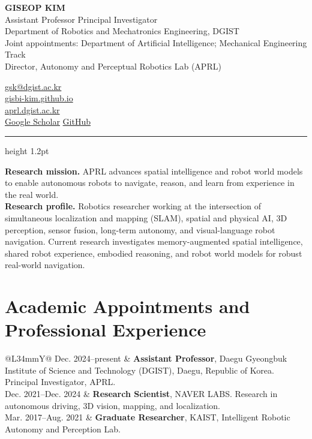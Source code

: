 \documentclass[10pt,a4paper]{article}
\newcommand{\daterow}[2]{#1 & #2 \\[2.2pt]}
\begin{document}
\begin{minipage}[t]{0.63\textwidth}
  {\sffamily\bfseries\fontsize{28}{31}\selectfont GISEOP KIM}\\[4pt]
  {\sffamily\large Assistant Professor \textbar{} Principal Investigator}\\[3pt]
  Department of Robotics and Mechatronics Engineering, DGIST\\
  Joint appointments: Department of Artificial Intelligence; Mechanical Engineering Track\\
  Director, Autonomy and Perceptual Robotics Lab (APRL)
\end{minipage}
\hfill
\begin{minipage}[t]{0.33\textwidth}
  \raggedleft\small
  \href{mailto:gsk@dgist.ac.kr}{gsk@dgist.ac.kr}\\
  \href{https://gisbi-kim.github.io/}{gisbi-kim.github.io}\\
  \href{https://aprl.dgist.ac.kr}{aprl.dgist.ac.kr}\\
  \href{https://scholar.google.com/citations?user=9mKOLX8AAAAJ}{Google Scholar} \textbar{} \href{https://github.com/gisbi-kim}{GitHub}
\end{minipage}

\vspace{7pt}
\hrule height 1.2pt
\vspace{7pt}

\textbf{Research mission.} APRL advances spatial intelligence and robot world models to enable autonomous robots to navigate, reason, and learn from experience in the real world.\\[4pt]
\textbf{Research profile.} Robotics researcher working at the intersection of simultaneous localization and mapping (SLAM), spatial and physical AI, 3D perception, sensor fusion, long-term autonomy, and visual-language robot navigation. Current research investigates memory-augmented spatial intelligence, shared robot experience, embodied reasoning, and robot world models for robust real-world navigation.

\section{Academic Appointments and Professional Experience}
\begin{tabularx}{\textwidth}{@{}L{34mm}Y@{}}
\daterow{Dec. 2024--present}{\textbf{Assistant Professor}, Daegu Gyeongbuk Institute of Science and Technology (DGIST), Daegu, Republic of Korea. Principal Investigator, APRL.}
\daterow{Dec. 2021--Dec. 2024}{\textbf{Research Scientist}, NAVER LABS. Research in autonomous driving, 3D vision, mapping, and localization.}
\daterow{Mar. 2017--Aug. 2021}{\textbf{Graduate Researcher}, KAIST, Intelligent Robotic Autonomy and Perception Lab.}
\end{tabularx}
\end{document}
